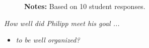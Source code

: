 \begin{boenumerate}
\begin{figure}[h!]\centering
{}\hspace{0.5cm}
\begin{center}
\begin{minipage}[t]{0.85\columnwidth}\vspace{-0.75cm}
\item\scriptsize{\textbf{Notes:} Based on 10 student responses.}
\end{minipage}
\end{center}
\end{figure}
\FloatBarrier
\item \textit{How well did Philipp meet his goal ...}
\begin{itemize}
\item \textit{to be well organized?}


\end{itemize}
\end{boenumerate}
